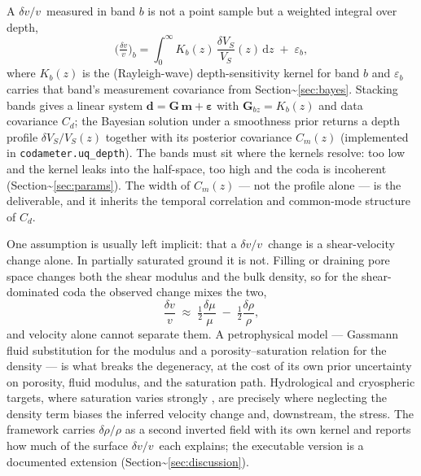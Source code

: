 \documentclass[
  referee]{gji}
\providecommand{\dvv}{\ensuremath{\delta v/v}}
\begin{document}
A \dvv~measured in band \(b\) is not a point sample but a weighted
integral over depth, \begin{equation}
\Big(\tfrac{\delta v}{v}\Big)_b = \int_0^\infty K_b(z)\,\frac{\delta V_S}{V_S}(z)\,\mathrm{d}z \;+\; \varepsilon_b,
\label{eq:kernel}
\end{equation} where \(K_b(z)\) is the (Rayleigh-wave) depth-sensitivity
kernel for band \(b\) and \(\varepsilon_b\) carries that band's
measurement covariance from Section\textasciitilde{}\ref{sec:bayes}.
Stacking bands gives a linear system
\(\mathbf{d}=\mathbf{G}\,\mathbf{m}+\boldsymbol\varepsilon\) with
\(\mathbf{G}_{bz}=K_b(z)\) and data covariance \(C_d\); the Bayesian
solution under a smoothness prior returns a depth profile
\(\delta V_S/V_S(z)\) together with its posterior covariance \(C_m(z)\)
(implemented in \texttt{codameter.uq\_depth}). The bands must sit where
the kernels resolve: too low and the kernel leaks into the half-space,
too high and the coda is incoherent
(Section\textasciitilde{}\ref{sec:params}). The width of \(C_m(z)\) ---
not the profile alone --- is the deliverable, and it inherits the
temporal correlation and common-mode structure of \(C_d\).

One assumption is usually left implicit: that a \dvv~change is a
shear-velocity change alone. In partially saturated ground it is not.
Filling or draining pore space changes both the shear modulus and the
bulk density, so for the shear-dominated coda the observed change mixes
the two, \begin{equation}
\frac{\delta v}{v} \;\approx\; \tfrac12\frac{\delta\mu}{\mu} \;-\; \tfrac12\frac{\delta\rho}{\rho},
\label{eq:density}
\end{equation} and velocity alone cannot separate them. A petrophysical
model --- Gassmann fluid substitution for the modulus and a
porosity--saturation relation for the density
\citep{Gassmann1951, Mavko2009} --- is what breaks the degeneracy, at
the cost of its own prior uncertainty on porosity, fluid modulus, and
the saturation path. Hydrological and cryospheric targets, where
saturation varies strongly \citep{Clements2018, James2019}, are
precisely where neglecting the density term biases the inferred velocity
change and, downstream, the stress. The framework carries
\(\delta\rho/\rho\) as a second inverted field with its own kernel and
reports how much of the surface \dvv~each explains; the executable
version is a documented extension
(Section\textasciitilde{}\ref{sec:discussion}).
\end{document}
